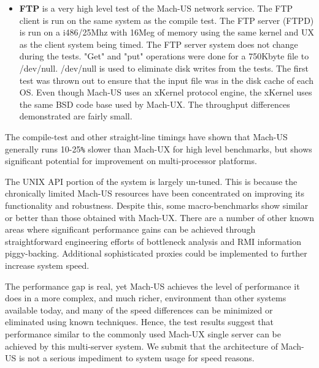 \begin{itemize}
\item  {\bf FTP} is a very high level test of the Mach-US network service.
The FTP client is run on the same system as the compile test.  The
FTP server (FTPD) is run on
a i486/25Mhz with 16Meg of memory using the same kernel and UX as the
client system being timed.  The FTP server system does not change during
the tests.
"Get" and "put" operations were done for a 750Kbyte file to
/dev/null.  /dev/null is used to eliminate disk writes from the tests.
The first test was thrown out to ensure that the input file was in
the disk cache of each OS.  Even though Mach-US uses an
xKernel protocol engine, the xKernel uses the  same BSD code base used by
Mach-UX.  The throughput differences demonstrated are fairly small.
\end{itemize}
The compile-test and other straight-line timings
have shown that Mach-US generally runs 10-25\verb"%" slower
than Mach-UX for high level benchmarks, but shows significant
potential for improvement on multi-processor platforms.

The UNIX API portion of the system is largely un-tuned.
This is because the
chronically limited Mach-US resources have been
concentrated on improving its functionality
and robustness.  Despite this, some macro-benchmarks
show similar or better than those obtained with Mach-UX.
There are a
number of other known areas where significant performance gains can be
achieved through straightforward engineering efforts of bottleneck
analysis and RMI information piggy-backing.
Additional sophisticated proxies could be
implemented to further increase system speed.

The performance gap is real, yet
Mach-US achieves the level of performance it does in a
more complex, and much richer, environment than
other systems available today, and many of the speed differences can
be minimized or eliminated using known techniques.
Hence, the test results suggest that performance similar
to the commonly used Mach-UX single server can be achieved by this
multi-server system.  We submit that the architecture of Mach-US is not a
serious  impediment
to system usage for speed reasons. 


